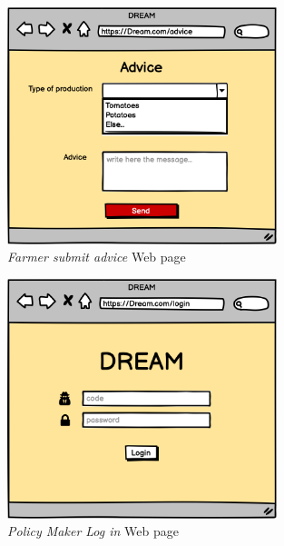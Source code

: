 \begin{figure}[H]
    \begin{center}
    \includegraphics[width=0.7\textwidth]{mockups/Advice.png}
    \caption{\emph{Farmer submit advice} Web page}
    \label{fig:submit advice}
    \end{center}
\end{figure}

\begin{figure}[H]
    \begin{center}
    \includegraphics[width=0.7\textwidth]{mockups/PMLogIn.png}
    \caption{\emph{Policy Maker Log in} Web page}
    \label{fig:PMlogin}
    \end{center}
\end{figure}

